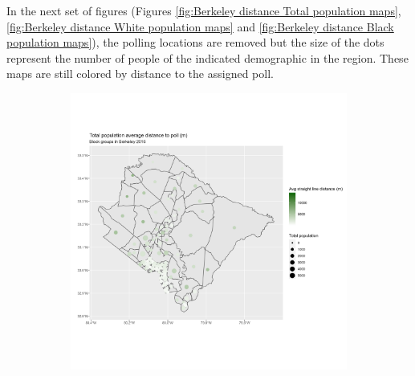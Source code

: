 \documentclass[11pt]{article}
\theoremstyle{remark}
\theoremstyle{definition}
\begin{document}
In the next set of figures (Figures \ref{fig:Berkeley distance Total population maps}, \ref{fig:Berkeley distance White population maps} and \ref{fig:Berkeley distance Black population maps}), the polling locations are removed but the size of the dots represent the number of people of the indicated demographic in the region. These maps are still colored by distance to the assigned poll.

\begin{figure}
	\begin{subfigure}{.5\textwidth}
		\centering
		\includegraphics[width=\linewidth]{result_analysis/Berkeley_County_SC_original_configs/population_pop_and_dist_Berkeley_config_original_2016_polls.png}
		\label{sfig:York_2016_bg_dist_pop}
	\end{subfigure} 
	\begin{subfigure}{.5\textwidth}
		\centering

\end{subfigure}
\end{figure}
\end{document}
